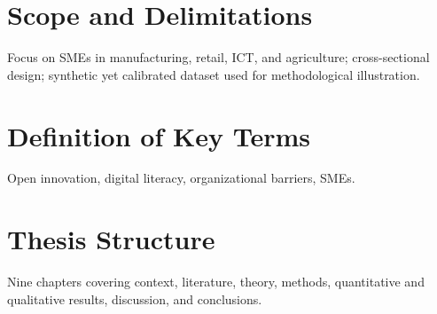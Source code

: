 \section{Scope and Delimitations}
Focus on SMEs in manufacturing, retail, ICT, and agriculture; cross-sectional design; synthetic yet calibrated dataset used for methodological illustration.

\section{Definition of Key Terms}
Open innovation, digital literacy, organizational barriers, SMEs.

\section{Thesis Structure}
Nine chapters covering context, literature, theory, methods, quantitative and qualitative results, discussion, and conclusions.
